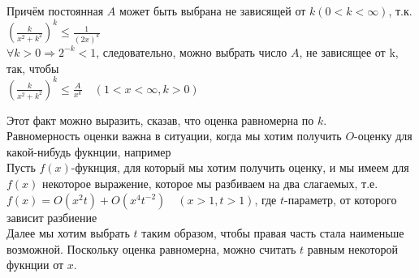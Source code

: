 \documentclass{report}
\begin{document}
Причём постоянная $A$ может быть выбрана не зависящей от $k(0<k<\infty)$, т.к. \\
${(\frac{k}{x^{2}+k^{2}})}^{k}\le\frac{1}{{(2x)}^{k}}$ \\
$\forall k>0 \Rightarrow   2^{-k}<1$, следовательно, можно выбрать число $A$, не зависящее от k, так, чтобы \\
${(\frac{k}{x^{2}+k^{2}})}^{k}\le\frac{A}{x^{k}}\quad(1<x<\infty, k>0)$ \\
\begin{center}
\end{center}
\begin{center}
\end{center}
Этот факт можно выразить, сказав, что оценка равномерна по $k$. \\
Равномерность оценки важна в ситуации, когда мы хотим получить $O$-оценку для какой-нибудь фукнции, например \\
Пусть $f(x)$-фукнция, для который мы хотим получить оценку, и мы имеем для $f(x)$ некоторое выражение, которое мы разбиваем на два слагаемых, т.е. \\
$f(x)=O(x^{2}t)+O(x^{4}t^{-2})\quad(x>1,t>1)$, где $t$-параметр, от которого зависит разбиение \\
Далее мы хотим выбрать $t$ таким образом, чтобы правая часть стала наименьше возможной. Поскольку оценка равномерна, можно считать $t$ равным некоторой фукнции от $x$. \\
\end{document}
